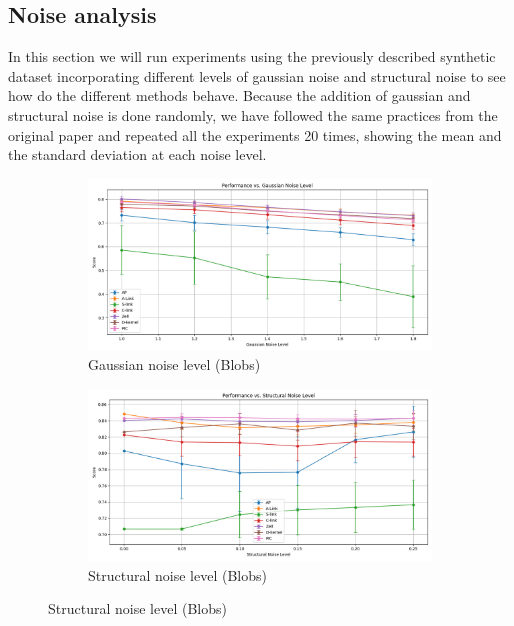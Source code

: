 \documentclass[
	10pt,
	parskip=half-,	
	paper=a4,
	english
	]{scrartcl}
\begin{document}
\subsection{Noise analysis}

In this section we will run experiments using the previously described synthetic dataset incorporating different levels of gaussian noise and structural noise to see how do the different methods behave. Because the addition of gaussian and structural noise is done randomly, we have followed the same practices from the original paper and repeated all the experiments 20 times, showing the mean and the standard deviation at each noise level.

\begin{figure}[h!]
    \centering
    \begin{subfigure}[b]{0.45\textwidth}
        \includegraphics[width=\textwidth]{../data/plots/results_gaussian_noise_blobs.png}
        \caption{Gaussian noise level (Blobs)}
    \end{subfigure}
    \begin{subfigure}[b]{0.45\textwidth}
        \includegraphics[width=\textwidth]{../data/plots/results_structural_noise_blobs.png}
        \caption{Structural noise level (Blobs)}
    \end{subfigure}
    

\end{figure}
\end{document}
